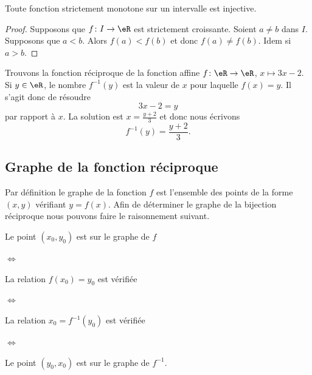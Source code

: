 \begin{lemma}       \label{LEMooSDMMooYYDDLs}
	Toute fonction strictement monotone sur un intervalle est injective.
\end{lemma}

\begin{proof}
	Supposons que \(f \colon I\to \eR  \) est strictement croissante. Soient \( a\neq b\) dans \( I\). Supposons que \( a<b\). Alors \( f(a)<f(b)\) et donc \( f(a)\neq f(b)\). Idem si \( a>b\).
\end{proof}

\begin{example}
	Trouvons la fonction réciproque de la fonction affine \( f\colon \eR\to \eR\), \( x\mapsto 3x-2\). Si \( y\in \eR\), le nombre \( f^{-1}(y)\) est la valeur de \( x\) pour laquelle \( f(x)=y\). Il s'agit donc de résoudre
	\begin{equation}
		3x-2=y
	\end{equation}
	par rapport à \( x\). La solution est \( x=\frac{ y+2 }{ 3 }\) et donc nous écrivons
	\begin{equation}
		f^{-1}(y)=\frac{ y+2 }{ 3 }.
	\end{equation}
\end{example}

\subsection{Graphe de la fonction réciproque}

Par définition le graphe de la fonction \( f\) est l'ensemble des points de la forme \( (x,y)\) vérifiant \( y=f(x)\). Afin de déterminer le graphe de la bijection réciproque nous pouvons faire le raisonnement suivant.

Le point \( (x_0,y_0)\) est sur le graphe de \( f\)

\noindent\( \Leftrightarrow\)

La relation \( f(x_0)=y_0\) est vérifiée

\noindent\( \Leftrightarrow\)

La relation \( x_0=f^{-1}(y_0)\) est vérifiée

\noindent\( \Leftrightarrow\)

Le point \( (y_0,x_0)\) est sur le graphe de \( f^{-1}\).

